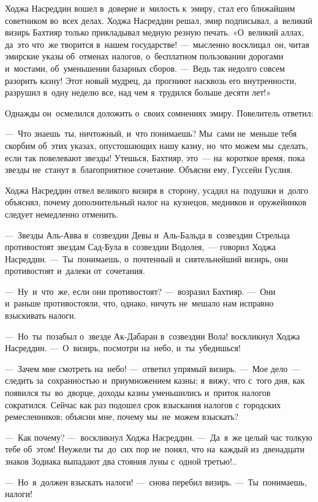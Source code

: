 \documentclass[12pt,a4paper]{book}
\begin{document}
Ходжа Насреддин вошел в~доверие и~милость к~эмиру, стал его ближайшим советником во~всех делах. Ходжа Насреддин решал, эмир подписывал, а~великий визирь Бахтияр только прикладывал медную резную печать. «О~великий аллах, да~это что~же творится в~нашем государстве! —~мысленно восклицал~он, читая эмирские указы об~отменах налогов, о~бесплатном пользовании дорогами и~мостами, об~уменьшении базарных сборов. —~Ведь так недолго совсем разорить казну! Этот новый мудрец, да~прогниют насквозь его внутренности, разрушил в~одну неделю все, над чем я~трудился больше десяти лет!»

Однажды он~осмелился доложить о~своих сомнениях эмиру. Повелитель ответил:

—~Что знаешь~ты, ничтожный, и~что понимаешь? Мы~сами не~меньше тебя скорбим об~этих указах, опустошающих нашу казну, но~что можем мы~сделать, если так повелевают звезды! Утешься, Бахтияр, это~— на~короткое время, пока звезды не~станут в~благоприятное сочетание. Объясни ему, Гуссейн Гуслия.

Ходжа Насреддин отвел великого визиря в~сторону, усадил на~подушки и~долго объяснял, почему дополнительный налог на~кузнецов, медников и~оружейников следует немедленно отменить.

—~Звезды Аль-Авва в~созвездии Девы и~Аль-Бальда в~созвездии Стрельца противостоят звездам Сад-Була в~созвездии Водолея,~— говорил Ходжа Насреддин. —~Ты~понимаешь, о~почтенный и~сиятельнейший визирь, они противостоят и~далеки от~сочетания.

—~Ну~и~что~же, если они противостоят? —~возразил Бахтияр. —~Они и~раньше противостояли, что, однако, ничуть не~мешало нам исправно взыскивать налоги.

—~Но~ты~позабыл о~звезде Ак-Дабаран в~созвездии Вола! воскликнул Ходжа Насреддин. —~О~визирь, посмотри на~небо, и~ты~убедишься!

—~Зачем мне смотреть на~небо! —~ответил упрямый визирь. —~Мое дело~— следить за~сохранностью и~приумножением казны; я~вижу, что с~того дня, как появился ты~во~дворце, доходы казны уменьшились и~приток налогов сократился. Сейчас как раз подошел срок взыскания налогов с~городских ремесленников; объясни мне, почему мы~не~можем взыскать?

—~Как почему? —~воскликнул Ходжа Насреддин. —~Да~я~же целый час толкую тебе об~этом! Неужели ты~до~сих пор не~понял, что на~каждый из~двенадцати знаков Зодиака выпадают два стояния луны с~одной третью!..

—~Но~я~должен взыскать налоги! —~снова перебил визирь. —~Ты~понимаешь, налоги!
\end{document}
